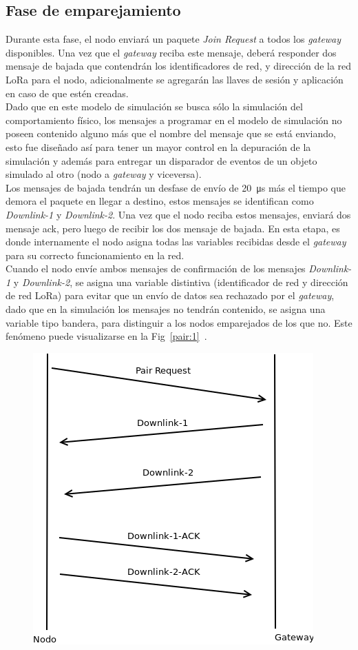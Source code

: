 \begin{justify}
\subsection{Fase de emparejamiento}
Durante esta fase, el nodo enviará un paquete \textit{Join Request} a todos los \textit{gateway} disponibles. Una vez que el \textit{gateway} reciba este mensaje, deberá responder dos mensaje de bajada que contendrán los identificadores de red, y dirección de la red LoRa para el nodo, adicionalmente se agregarán las llaves de sesión y aplicación en caso de que estén creadas.\\
Dado que en este modelo de simulación se busca sólo la simulación del comportamiento físico, los mensajes a programar en el modelo de simulación no poseen contenido alguno más que el nombre del mensaje que se está enviando, esto fue diseñado así para tener un mayor control en la depuración de la simulación y además para entregar un disparador de eventos de un objeto simulado al otro (nodo a \textit{gateway} y viceversa).\\
Los mensajes de bajada tendrán un desfase de envío de \SI{20}{\micro\s} más el tiempo que demora el paquete en llegar a destino, estos mensajes se identifican como \textit{Downlink-1} y \textit{Downlink-2}. \newpage \noindent 
Una vez que el nodo reciba estos mensajes, enviará dos mensaje \gls{ack}, pero luego de recibir los dos mensaje de bajada. En esta etapa, es donde internamente el nodo asigna todas las variables recibidas desde el \textit{gateway} para su correcto funcionamiento en la red.\\
Cuando el nodo envíe ambos mensajes de confirmación de los mensajes \textit{Downlink-1} y \textit{Downlink-2}, se asigna una variable distintiva (identificador de red y dirección de red LoRa) para evitar que un envío de datos sea rechazado por el \textit{gateway}, dado que en la simulación los mensajes no tendrán contenido, se asigna una variable tipo bandera, para distinguir a los nodos emparejados de los que no. Este fenómeno puede visualizarse en la Fig~\ref{pair:1}~\cite{Sornin}.
\begin{figure}[!ht]
\centering
\includegraphics[scale=0.5]{diagramas/pair}

\end{figure}
\end{justify}

